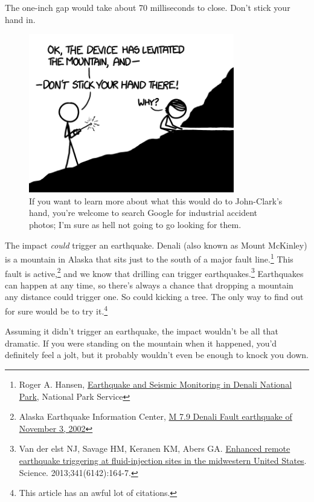 {\hfill{}

{The one-inch gap would take about 70 milliseconds to close. Don't stick your hand in.}

\begin{figure}[!htbp]
\centering
\includegraphics[scale=0.5, max width=0.8\textwidth]{imgs/a/57/mountain_hand.png}
\caption{If you want to learn more about what this would do to John-Clark's hand, you're welcome to search Google for industrial accident photos; I'm sure as hell not going to go looking for them.}
\end{figure}

{The impact \emph{could} trigger an earthquake. Denali (also known as Mount McKinley) is a mountain in Alaska that sits just to the south of a major fault line.{\footnote{Roger A. Hansen, \href{http://www.nps.gov/akso/nature/science/ak\_park\_science/PDF/2006Vol5-1/Earthquake-Monitoring.pdf}{Earthquake and Seismic Monitoring in Denali National Park}, National Park Service} } This fault is active,{\footnote{Alaska Earthquake Information Center, \href{http://www.aeic.alaska.edu/Denali\_Fault\_2002/}{M 7.9 Denali Fault earthquake of November 3, 2002}} } and we know that drilling can trigger earthquakes.{\footnote{Van der elst NJ, Savage HM, Keranen KM, Abers GA. \href{http://www.sciencemag.org/content/341/6142/164.abstract} {Enhanced remote earthquake triggering at fluid-injection sites in the midwestern United States}. Science. 2013;341(6142):164-7.} } Earthquakes can happen at any time, so there's always a chance that dropping a mountain any distance could trigger one. So could kicking a tree. The only way to find out for sure would be to try it.{\footnote{This article has an awful lot of citations.} } }

{Assuming it didn't trigger an earthquake, the impact wouldn't be all that dramatic. If you were standing on the mountain when it happened, you'd definitely feel a jolt, but it probably wouldn't even be enough to knock you down.}

}
